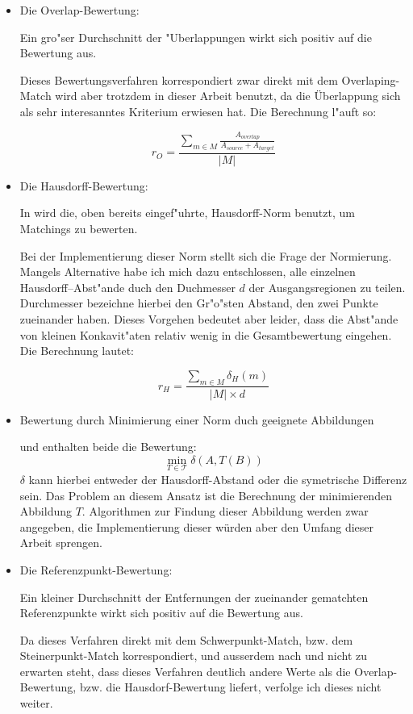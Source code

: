 \begin{itemize}
\item Die Overlap-Bewertung: 

Ein gro"ser Durchschnitt der "Uberlappungen wirkt sich positiv auf die Bewertung aus.

Dieses Bewertungsverfahren korrespondiert zwar direkt mit dem Overlaping-Match wird aber trotzdem in dieser Arbeit benutzt, da die Überlappung sich als sehr interesanntes Kriterium erwiesen hat. Die Berechnung l"auft so:

$$r_O=\frac{\sum_{m\in M} \frac{A_{overlap}}{A_{source}+A_{target}}}{|M|}$$

\item Die Hausdorff-Bewertung:

In \cite{AAR} wird die,  oben bereits eingef"uhrte, Hausdorff-Norm benutzt, um Matchings zu bewerten. 

Bei der Implementierung dieser Norm stellt sich die Frage der Normierung. Mangels Alternative habe ich mich dazu entschlossen, alle einzelnen Hausdorff--Abst"ande duch den Duchmesser $d$ der Ausgangsregionen zu teilen.  Durchmesser bezeichne hierbei den Gr"o"sten Abstand, den zwei Punkte zueinander haben. Dieses Vorgehen bedeutet aber leider, dass die Abst"ande von kleinen Konkavit"aten relativ wenig in die Gesamtbewertung eingehen. Die Berechnung lautet:

$$r_H=\frac{\sum_{m\in M}\delta_H(m)}{|M|\times d}$$

\item Bewertung durch Minimierung einer Norm duch geeignete Abbildungen

\cite{AAR} und \cite{AFRW} enthalten beide die Bewertung:
$$\min_{T\in\mathcal{T}}\delta(A,T(B))$$
$\delta$ kann hierbei entweder der Hausdorff-Abstand oder die symetrische Differenz sein. Das Problem an diesem Ansatz ist die Berechnung der minimierenden Abbildung $T$. Algorithmen zur Findung dieser Abbildung werden zwar angegeben, die Implementierung dieser würden aber den Umfang dieser Arbeit sprengen.

\item Die Referenzpunkt-Bewertung:

Ein kleiner Durchschnitt der Entfernungen der zueinander gematchten Referenzpunkte wirkt sich positiv auf die Bewertung aus.

Da dieses Verfahren direkt mit dem Schwerpunkt-Match, bzw. dem Steinerpunkt-Match korrespondiert, und ausserdem nach \cite{AFRW} und \cite{AAR} nicht zu erwarten steht, dass dieses Verfahren deutlich andere Werte als die Overlap-Bewertung, bzw. die Hausdorf-Bewertung liefert, verfolge ich dieses nicht weiter.


\end{itemize}
